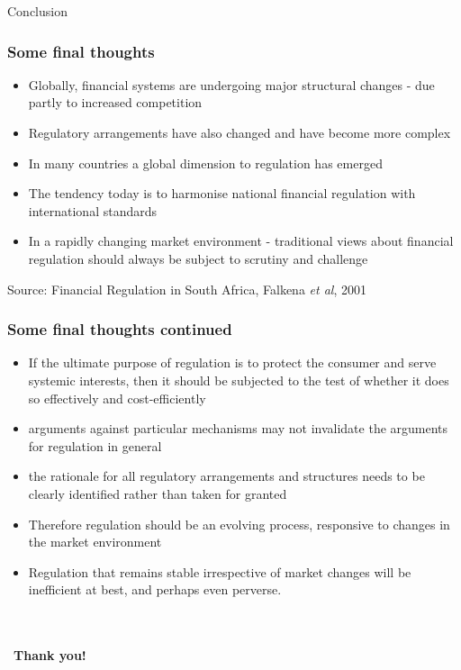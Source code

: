 \documentclass[11pt]{beamer}
\newcommand{\mcdbl}[1]{{{\bf \color{navy}#1}}}
\begin{document}



\begin{frame}
\begin{center}
Conclusion
\end{center}
\end{frame}
\begin{frame}
\frametitle{Some final thoughts}
\begin{itemize}
\item Globally, financial systems are undergoing major structural changes - due partly to increased competition
\item Regulatory arrangements have also changed and have become more complex
\item In many countries a global dimension to regulation has emerged
\item The tendency today is to harmonise national financial regulation with international standards
\item In a rapidly changing market environment - traditional views about financial regulation should always be subject to scrutiny 	and challenge
\end{itemize}
\tiny{Source: Financial Regulation in South Africa, Falkena \textit{et al}, 2001}
\end{frame}

\begin{frame}
\frametitle{Some final thoughts continued}
\begin{itemize}
\item If the ultimate purpose of regulation is to protect the consumer and serve systemic interests, then it should be subjected to the test of whether it does so effectively and cost-efficiently
\item arguments against particular mechanisms may not invalidate the arguments for regulation in general
\item the rationale for all regulatory arrangements and structures needs to be clearly identified rather than taken for granted
\item Therefore regulation should be an evolving process, responsive to changes in the market environment
\item Regulation that remains stable irrespective of market changes will be inefficient at best, and perhaps even perverse.
\end{itemize}
~\\
~\\
~\hfill \mcdbl{Thank you!}
\end{frame}
\end{document}
